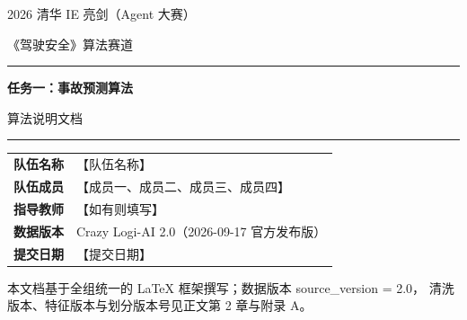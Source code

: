 \documentclass[11pt,a4paper,fontset=windows]{ctexart}
\begin{document}
\begin{titlepage}
  \centering
  \vspace*{2.5cm}
  {\Large 2026 清华 IE 亮剑（Agent 大赛）\par}
  \vspace{0.4cm}
  {\Large 《驾驶安全》算法赛道\par}
  \vspace{2.2cm}
  \rule{\textwidth}{0.8pt}\par
  \vspace{0.8cm}
  {\Huge\bfseries 任务一：事故预测算法\par}
  \vspace{0.5cm}
  {\LARGE 算法说明文档\par}
  \vspace{0.8cm}
  \rule{\textwidth}{0.8pt}\par
  \vspace{3.2cm}

  \large
  \begin{tabular}{rl}
    \textbf{队伍名称} & 【队伍名称】 \\[0.4em]
    \textbf{队伍成员} & 【成员一、成员二、成员三、成员四】 \\[0.4em]
    \textbf{指导教师} & 【如有则填写】 \\[0.4em]
    \textbf{数据版本} & Crazy Logi-AI 2.0（2026-09-17 官方发布版） \\[0.4em]
    \textbf{提交日期} & 【提交日期】 \\
  \end{tabular}

  \vfill
  {\small 本文档基于全组统一的 \LaTeX{} 框架撰写；数据版本 source\_version = 2.0，
  清洗版本、特征版本与划分版本号见正文第 2 章与附录 A。}
  \vspace*{1.5cm}
\end{titlepage}

\noindent{}\par\bigskip

\tableofcontents
\newpage










\appendix



\end{document}
